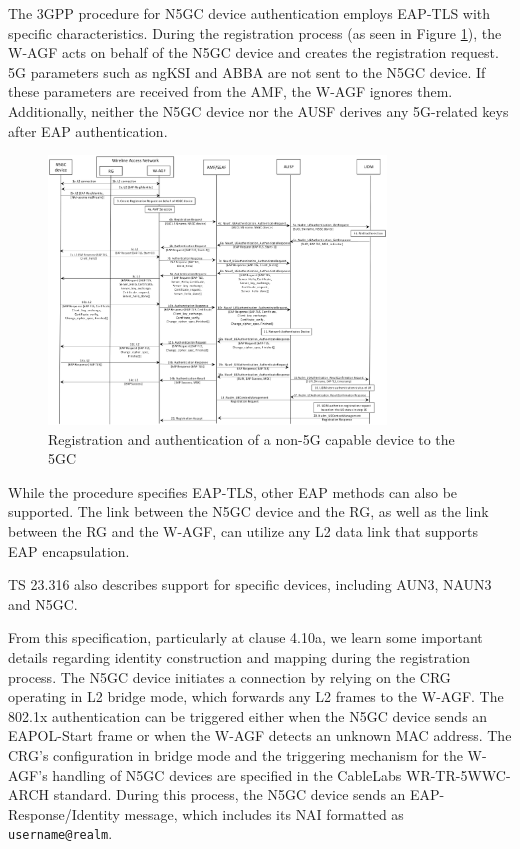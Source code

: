 The \ac{3GPP} procedure for \ac{N5GC} device authentication employs \ac{EAP-TLS} with specific characteristics. During the registration process (as seen in Figure \ref{fig:n5gc-eap-tls}), the \ac{W-AGF} acts on behalf of the \ac{N5GC} device and creates the registration request. \ac{5G} parameters such as \ac{ngKSI} and \ac{ABBA} are not sent to the \ac{N5GC} device. If these parameters are received from the \ac{AMF}, the \ac{W-AGF} ignores them. Additionally, neither the \ac{N5GC} device nor the \ac{AUSF} derives any \ac{5G}-related keys after \ac{EAP} authentication.

\begin{figure}[htbp]
    \centering
    \includegraphics[width=0.8\textwidth]{figs/Registration and authentication of a non-5G capable device to the 5GC.png}
    \caption{Registration and authentication of a non-5G capable device to the 5GC}
    \label{fig:n5gc-eap-tls}
\end{figure}

While the procedure specifies \ac{EAP-TLS}, other \ac{EAP} methods can also be supported. The link between the \ac{N5GC} device and the \ac{RG}, as well as the link between the \ac{RG} and the \ac{W-AGF}, can utilize any \ac{L2} data link that supports \ac{EAP} encapsulation.

TS 23.316 also describes support for specific devices, including \ac{AUN3}, \ac{NAUN3} and \ac{N5GC}. 

From this specification, particularly at clause 4.10a, we learn some important details regarding identity construction and mapping during the registration process. The \ac{N5GC} device initiates a connection by relying on the \ac{CRG} operating in L2 bridge mode, which forwards any L2 frames to the \ac{W-AGF}. The \ac{802.1x} authentication can be triggered either when the \ac{N5GC} device sends an \ac{EAPOL}-Start frame or when the \ac{W-AGF} detects an unknown \ac{MAC} address. The \ac{CRG}'s configuration in bridge mode and the triggering mechanism for the \ac{W-AGF}'s handling of \ac{N5GC} devices are specified in the CableLabs \ac{WR-TR-5WWC-ARCH} standard. During this process, the \ac{N5GC} device sends an \ac{EAP}-Response/Identity message, which includes its \ac{NAI} formatted as \texttt{username@realm}.

